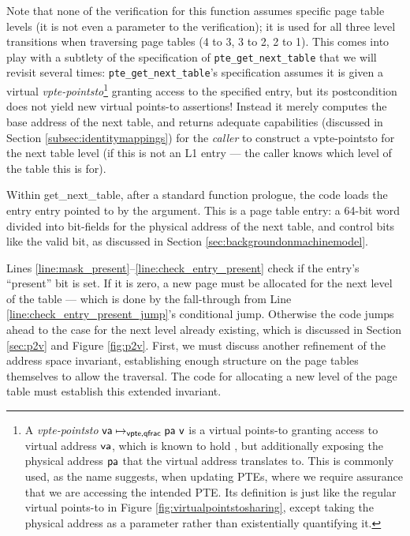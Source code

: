 Note that none of the verification for this function assumes specific page table levels (it is not even a parameter to the verification);
it is used for all three level transitions when traversing page tables (4 to 3, 3 to 2, 2 to 1).
This comes into play with a subtlety of the specification of \lstinline|pte_get_next_table| that we will
revisit several times: \lstinline|pte_get_next_table|'s specification
assumes it is given a virtual \emph{vpte-pointsto}\footnote{A \emph{vpte-pointsto}
$\mathsf{va}\mapsto_{\textsf{vpte,qfrac}} \textsf{\textsf{pa}~v}$ is a virtual points-to granting
access to virtual address $\mathsf{va}$, which is known to hold \textsf{\val}, but additionally exposing the physical address
$\textsf{pa}$ that the virtual address translates to. This is commonly used, as the name suggests, when updating PTEs,
where we require assurance that we are accessing the intended PTE.
Its definition is just like the regular virtual points-to in Figure \ref{fig:virtualpointstosharing},
except taking the physical address as a parameter rather than existentially quantifying it.
}
 granting access to the specified entry,
but its postcondition does not yield new virtual points-to assertions!
Instead it merely computes the base address of the next table, and returns adequate capabilities (discussed in Section \ref{subsec:identitymappings})
for the \emph{caller} to construct a vpte-pointsto for the next table level (if this is not an L1 entry ---
the caller knows which level of the table this is for).

Within \textsf{get\_next\_table}, after a standard function prologue, the code 
loads the entry \textsf{entry} pointed to by the argument.
This is a page table entry: a 64-bit word divided into bit-fields for
the physical address of the next table, and control bits like the valid bit, as discussed in 
Section \ref{sec:backgroundonmachinemodel}.



Lines \ref{line:mask_present}--\ref{line:check_entry_present} check if the entry's ``present'' bit is set.
If it is zero, a new page must be allocated for the next level of the table --- which is done by the fall-through
from Line \ref{line:check_entry_present_jump}'s conditional jump. Otherwise the code jumps ahead to
the case for the next level already existing, which is discussed in Section \ref{sec:p2v} and Figure \ref{fig:p2v}.
First, we must discuss another refinement of the address space invariant, establishing
enough structure on the page tables themselves to allow the traversal.
The code for allocating a new level of the page table must establish this extended invariant.


